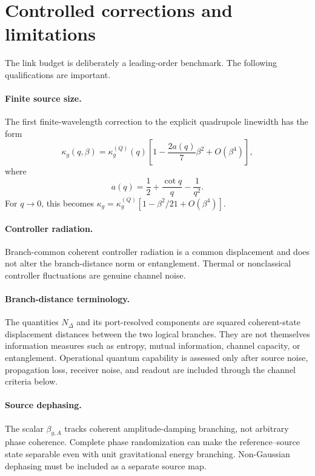 \section{Controlled corrections and limitations}
\label{sec:limitations}

The link budget is deliberately a leading-order benchmark. The following qualifications are important.

\paragraph{Finite source size.}
The first finite-wavelength correction to the explicit quadrupole linewidth has the form
\begin{equation}
\kappa_g(q,\beta)=\kappa_g^{(Q)}(q)
\left[1-\frac{2a(q)}7\beta^2+O(\beta^4)\right],
\end{equation}
where
\begin{equation}
a(q)=\frac12+\frac{\cot q}{q}-\frac1{q^2}.
\end{equation}
For $q\to0$, this becomes $\kappa_g=\kappa_g^{(Q)}[1-\beta^2/21+O(\beta^4)]$.

\paragraph{Controller radiation.}
Branch-common coherent controller radiation is a common displacement and does not alter the branch-distance norm or entanglement. Thermal or nonclassical controller fluctuations are genuine channel noise.

\paragraph{Branch-distance terminology.}
The quantities $N_\Delta$ and its port-resolved components are squared coherent-state displacement distances between the two logical branches. They are not themselves information measures such as entropy, mutual information, channel capacity, or entanglement. Operational quantum capability is assessed only after source noise, propagation loss, receiver noise, and readout are included through the channel criteria below.

\paragraph{Source dephasing.}
The scalar $\beta_{g,A}$ tracks coherent amplitude-damping branching, not arbitrary phase coherence. Complete phase randomization can make the reference--source state separable even with unit gravitational energy branching. Non-Gaussian dephasing must be included as a separate source map.

